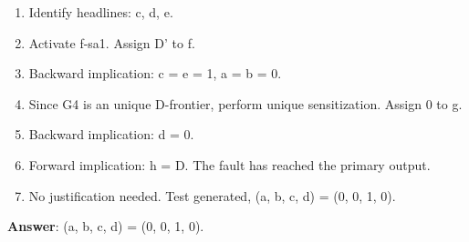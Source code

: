 
\begin{enumerate}
  \item Identify headlines: c, d, e.
  \item Activate f-sa1. Assign D' to f.
  \item Backward implication: c = e = 1, a = b = 0.
  \item Since G4 is an unique D-frontier, perform unique sensitization. Assign 0 to g.
  \item Backward implication: d = 0.
  \item Forward implication: h = D. The fault has reached the primary output.
  \item No justification needed. Test generated, (a, b, c, d) = (0, 0, 1, 0).
\end{enumerate}

\textbf{Answer}: (a, b, c, d) = (0, 0, 1, 0).
